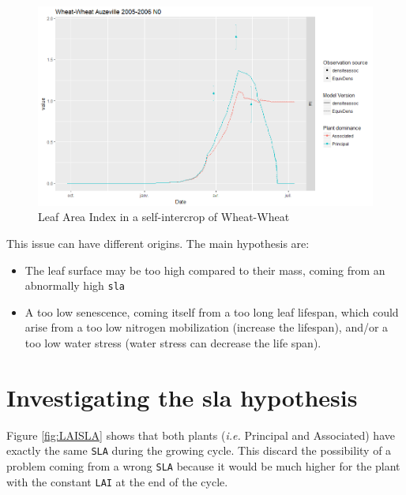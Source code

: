 \documentclass[
]{book}
\providecommand{\tightlist}{%
  \setlength{\itemsep}{0pt}\setlength{\parskip}{0pt}}
\begin{document}
\begin{figure}
\centering
\includegraphics{img/LAI_high.png}
\caption{\label{fig:LAIhigh}Leaf Area Index in a self-intercrop of Wheat-Wheat}
\end{figure}

This issue can have different origins. The main hypothesis are:

\begin{itemize}
\tightlist
\item
  The leaf surface may be too high compared to their mass, coming from an abnormally high \texttt{sla}\\
\item
  A too low senescence, coming itself from a too long leaf lifespan, which could arise from a too low nitrogen mobilization (increase the lifespan), and/or a too low water stress (water stress can decrease the life span).
\end{itemize}

\hypertarget{investigating-the-sla-hypothesis}{%
\section{Investigating the sla hypothesis}\label{investigating-the-sla-hypothesis}}

Figure \ref{fig:LAISLA} shows that both plants (\emph{i.e.} Principal and Associated) have exactly the same \texttt{SLA} during the growing cycle. This discard the possibility of a problem coming from a wrong \texttt{SLA} because it would be much higher for the plant with the constant \texttt{LAI} at the end of the cycle.
\end{document}
